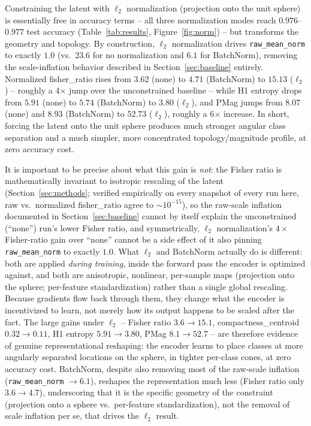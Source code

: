 \documentclass[11pt]{article}
\begin{document}
Constraining the latent with $\ell_2$ normalization (projection onto the
unit sphere) is essentially free in accuracy terms -- all three
normalization modes reach $0.976$--$0.977$ test accuracy
(Table~\ref{tab:results}, Figure~\ref{fig:norm}) -- but transforms the
geometry and topology. By construction, $\ell_2$ normalization drives
\texttt{raw\_mean\_norm} to exactly $1.0$ (vs.\ $23.6$ for no normalization
and $6.1$ for BatchNorm), removing the scale-inflation behavior described in
Section~\ref{sec:baseline} entirely. Normalized fisher\_ratio rises from
$3.62$ (none) to $4.71$ (BatchNorm) to $15.13$ ($\ell_2$) --
roughly a 4$\times$ jump over the unconstrained baseline -- while H1 entropy
drops from $5.91$ (none) to $5.74$ (BatchNorm) to $3.80$ ($\ell_2$), and
PMag jumps from $8.07$ (none) and $8.93$ (BatchNorm) to $52.73$ ($\ell_2$),
roughly a 6$\times$ increase. In short, forcing the latent onto the unit sphere produces much stronger
angular class separation and a much simpler, more concentrated
topology/magnitude profile, at zero accuracy cost.

It is important to be precise about what this gain is \emph{not}: the
Fisher ratio is mathematically invariant to isotropic rescaling of the
latent (Section~\ref{sec:methods}; verified empirically on every snapshot of
every run here, raw vs.\ normalized fisher\_ratio agree to $\sim10^{-15}$),
so the raw-scale inflation documented in Section~\ref{sec:baseline} cannot
by itself explain the unconstrained (``none'') run's lower Fisher ratio, and
symmetrically, $\ell_2$ normalization's $4\times$ Fisher-ratio gain over
``none'' cannot be a side effect of it also pinning \texttt{raw\_mean\_norm}
to exactly $1.0$. What $\ell_2$ and BatchNorm actually do is different: both
are applied \emph{during training}, inside the forward pass the encoder is
optimized against, and both are anisotropic, nonlinear, per-sample maps
(projection onto the sphere; per-feature standardization) rather than a
single global rescaling. Because gradients flow back through them, they
change what the encoder is incentivized to learn, not merely how its output
happens to be scaled after the fact. The large gains under $\ell_2$ --
Fisher ratio $3.6\to15.1$, compactness\_centroid $0.32\to0.11$, H1 entropy
$5.91\to3.80$, PMag $8.1\to52.7$ -- are therefore evidence of genuine
representational reshaping: the encoder learns to place classes at more
angularly separated locations on the sphere, in tighter per-class cones, at
zero accuracy cost. BatchNorm, despite also removing most of the raw-scale
inflation (\texttt{raw\_mean\_norm} $\to 6.1$), reshapes the representation
much less (Fisher ratio only $3.6\to4.7$), underscoring that it is the
specific geometry of the constraint (projection onto a sphere vs.\
per-feature standardization), not the removal of scale inflation per se,
that drives the $\ell_2$ result.
\end{document}
